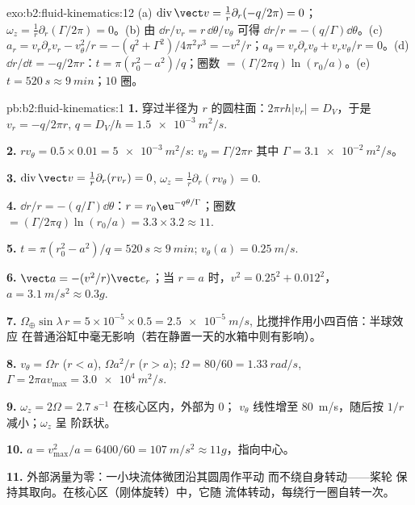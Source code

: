 \begin{solution}{exo:b2:fluid-kinematics:12}
(a) $\operatorname{div}\vect v = \frac1r\partial_r(-q/2\pi) = 0$；$\omega_z =
\frac1r\partial_r(\Gamma/2\pi) = 0$。(b) 由 $\dd r/v_r = r\,\dd\theta/v_\theta$ 可得
$\dd r/r = -(q/\Gamma)\dd\theta$。(c) $a_r = v_r\partial_rv_r - v_\theta^2/r =
-(q^2 + \Gamma^2)/4\pi^2r^3 = -v^2/r$；$a_\theta = v_r\partial_rv_\theta + v_rv_\theta/r
= 0$。(d) $\dd r/\dd t = -q/2\pi r$：$t = \pi(r_0^2 - a^2)/q$；圈数
$= (\Gamma/2\pi q)\ln(r_0/a)$。(e) $t = \qty{520}{s} \approx \qty{9}{min}$；$10$
圈。
\end{solution}

\begin{solution}{pb:b2:fluid-kinematics:1}
\textbf{1.} 穿过半径为 $r$ 的圆柱面：$2\pi rh|v_r| = D_V$，于是
$v_r = -q/2\pi r$, $q = D_V/h = \qty{1.5e-3}{m^2/s}$.

\textbf{2.} $rv_\theta = 0.5 \times 0.01 = \qty{5e-3}{m^2/s}$: $v_\theta = \Gamma/2\pi r$
其中 $\Gamma = \qty{3.1e-2}{m^2/s}$。

\textbf{3.} $\operatorname{div}\vect v = \frac1r\partial_r(rv_r) = 0$, $\omega_z =
\frac1r\partial_r(rv_\theta) = 0$.

\textbf{4.} $\dd r/r = -(q/\Gamma)\dd\theta$：$r = r_0\eu^{-q\theta/\Gamma}$；圈数
$= (\Gamma/2\pi q)\ln(r_0/a) = 3.3 \times 3.2 \approx 11$.

\textbf{5.} $t = \pi(r_0^2 - a^2)/q = \qty{520}{s} \approx \qty{9}{min}$; $v_\theta(a) =
\qty{0.25}{m/s}$.

\textbf{6.} $\vect a = -(v^2/r)\vect e_r$；当 $r = a$ 时，$v^2 = 0.25^2 + 0.012^2$，
$a = \qty{3.1}{m/s^2} \approx 0.3g$.

\textbf{7.} $\Omega_\oplus\sin\lambda\,r = 5 \times 10^{-5} \times 0.5 = \qty{2.5e-5}{m/s}$,
比搅拌作用小四百倍：半球效应
在普通浴缸中毫无影响（若在静置一天的水箱中则有影响）。

\textbf{8.} $v_\theta = \Omega r$ ($r < a$), $\Omega a^2/r$ ($r > a$); $\Omega = 80/60
= \qty{1.33}{rad/s}$, $\Gamma = 2\pi av_{\max} = \qty{3.0e4}{m^2/s}$.

\textbf{9.} $\omega_z = 2\Omega = \qty{2.7}{s^{-1}}$ 在核心区内，外部为 $0$；
$v_\theta$ 线性增至 \qty{80}{m/s}，随后按 $1/r$ 减小；$\omega_z$ 呈
阶跃状。

\textbf{10.} $a = v_{\max}^2/a = 6400/60 = \qty{107}{m/s^2} \approx 11g$，指向中心。

\textbf{11.} 外部涡量为零：一小块流体微团沿其圆周作平动
而不绕自身转动——桨轮
保持其取向。在核心区（刚体旋转）中，它随
流体转动，每绕行一圈自转一次。


\end{solution}
